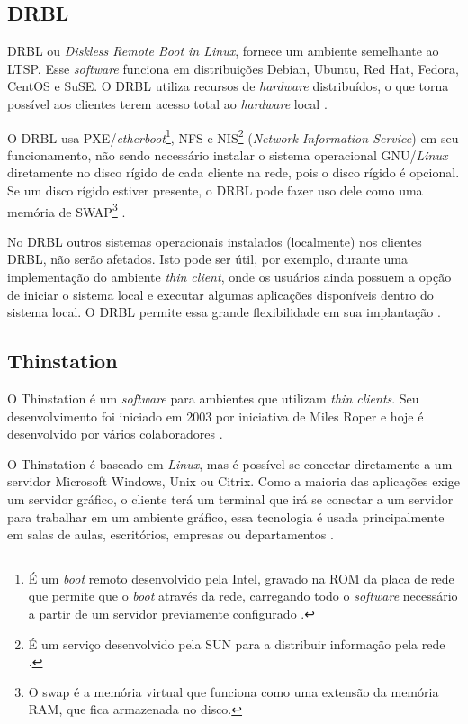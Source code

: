 \documentclass[
	12pt,				%
	openright,			%
	twoside,			%
	a4paper,			%
	chapter=TITLE,		%
	english,			%
	brazil				%
	]{abntex2}
\begin{document}
\subsection{DRBL}

DRBL ou \textit{Diskless Remote Boot in Linux}, fornece um ambiente semelhante ao LTSP. Esse \textit{software} funciona em distribuições Debian, Ubuntu, Red Hat, Fedora, CentOS e SuSE. O DRBL utiliza recursos de \textit{hardware} distribuídos, o que torna possível aos clientes terem acesso total ao \textit{hardware} local \cite{drbl}.

O DRBL usa PXE/\textit{etherboot}\footnote{É um \textit{boot} remoto desenvolvido pela Intel, gravado na ROM da placa de rede que permite que o \textit{boot} através da rede, carregando todo o \textit{software} necessário a partir de um servidor previamente configurado \cite{pxe}.}, NFS e NIS\footnote{É um serviço desenvolvido pela SUN para a distribuir informação pela rede \cite{nis}.} (\textit{Network Information Service}) em seu funcionamento, não sendo necessário instalar o sistema operacional GNU/\textit{Linux} diretamente no disco rígido de cada cliente na rede, pois o disco rígido é opcional. Se um disco rígido estiver presente, o DRBL pode fazer uso dele como uma memória de SWAP\footnote{O swap é a memória virtual que funciona como uma extensão da memória RAM, que fica armazenada no disco.} \cite{drbl,piaui,Frank.drbl}.

No DRBL outros sistemas operacionais instalados (localmente) nos clientes DRBL, não serão afetados. Isto pode ser útil, por exemplo, durante uma implementação do ambiente \textit{thin client}, onde os usuários ainda possuem a opção de iniciar o sistema local e executar algumas aplicações disponíveis dentro do sistema local. O DRBL permite essa grande flexibilidade em sua implantação \cite{drbl}.

\subsection{Thinstation}

O Thinstation é um \textit{software} para ambientes que utilizam \textit{thin clients}. Seu desenvolvimento foi iniciado em 2003 por iniciativa de Miles Roper e hoje é desenvolvido por vários colaboradores \cite{Thinstationl,piaui}.

O Thinstation é baseado em \textit{Linux}, mas é possível se conectar diretamente a um servidor Microsoft Windows, Unix ou Citrix. Como a maioria das aplicações exige um servidor gráfico, o cliente terá um terminal que irá se conectar a um servidor para trabalhar em um ambiente gráfico, essa tecnologia é usada principalmente em salas de aulas, escritórios, empresas ou departamentos \cite{Thinstationl}.
\end{document}
